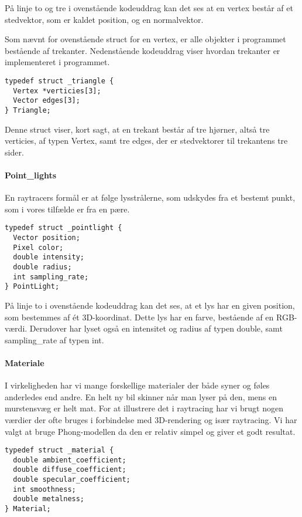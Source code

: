 På linje to og tre i ovenstående kodeuddrag kan det ses at en vertex består af et stedvektor, som er kaldet position, og en normalvektor.
    
Som nævnt for ovenstående struct for en vertex, er alle objekter i programmet bestående af trekanter. Nedenstående kodeuddrag viser hvordan trekanter er implementeret i programmet.
    
\begin{lstlisting}[style=Cstyle, caption=Struct til triangle]
typedef struct _triangle {
  Vertex *verticies[3];
  Vector edges[3];
} Triangle;
\end{lstlisting}

Denne struct viser, kort sagt, at en trekant består af tre hjørner, altså tre verticies, af typen Vertex, samt tre edges, der er stedvektorer til trekantens tre sider. 

\paragraph{Point\_lights}

En raytracers formål er at følge lysstrålerne, som udskydes fra et bestemt punkt, som i vores tilfælde er fra en pære. 

\begin{lstlisting}[style=Cstyle, caption=Struct til light]
typedef struct _pointlight {
  Vector position;
  Pixel color;
  double intensity;
  double radius;
  int sampling_rate;
} PointLight;
\end{lstlisting}

På linje to i ovenstående kodeuddrag kan det ses, at et lys har en given position, som bestemmes af ét 3D-koordinat. Dette lys har en farve, bestående af en RGB-værdi. Derudover har lyset også en intensitet og radius af typen double, samt sampling\_rate af typen int.

\paragraph{Materiale}
I virkeligheden har vi mange forskellige materialer der både syner og føles anderledes end andre. En helt ny bil skinner når man lyser på den, mens en murstensvæg er helt mat. For at illustrere det i raytracing har vi brugt nogen værdier der ofte bruges i forbindelse med 3D-rendering og især raytracing. Vi har valgt at bruge Phong-modellen da den er relativ simpel og giver et godt resultat.

\begin{lstlisting}[style=Cstyle, caption=Struct til Material]
typedef struct _material {
  double ambient_coefficient;
  double diffuse_coefficient;
  double specular_coefficient;
  int smoothness;
  double metalness; 
} Material;
\end{lstlisting}

